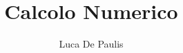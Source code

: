 \documentclass[
    oneside,
    10pt,
    language=italian,
    a4paper
]{notes}
\begin{document}
\author{Luca De Paulis}
\title{Calcolo Numerico}
\maketitle

\frontmatter{}
\tableofcontents

\mainmatter{}





% 


\appendix
% 

\end{document}
